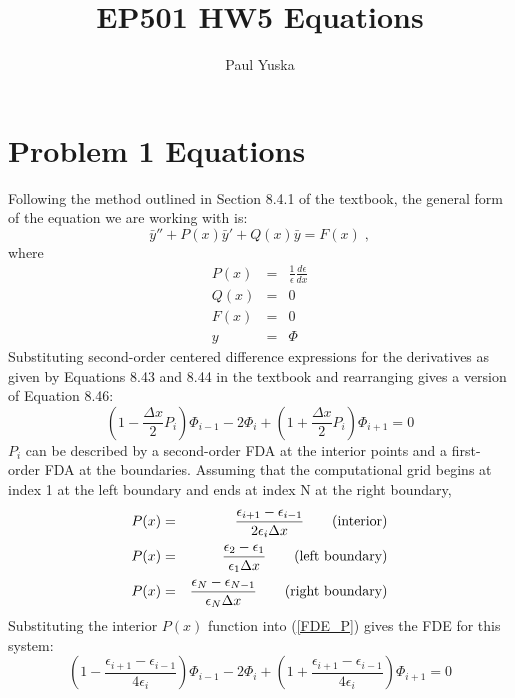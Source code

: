 \documentclass[12pt,letterpaper]{article}
\author{Paul Yuska}
\title{EP501 HW5 Equations}
\begin{document}
\maketitle

\section*{Problem 1 Equations}
Following the method outlined in Section 8.4.1 of the textbook, the general form of the equation we are working with is:
\begin{equation}
\bar{y}'' + P(x)\bar{y}' + Q(x)\bar{y} = F(x)\;,
\end{equation}
where
\begin{eqnarray*}
P(x) &=& \frac{1}{\epsilon}\frac{d\epsilon}{dx}\\
Q(x) &=& 0\\
F(x) &=& 0\\
y &=& \Phi
\end{eqnarray*}
Substituting second-order centered difference expressions for the derivatives as given by Equations 8.43 and 8.44 in the textbook and rearranging gives a version of Equation 8.46:
\begin{equation}
\label{FDE_P}
\left(1 - \frac{\Delta x}{2}P_i	\right)\Phi_{i-1} - 2\Phi_i + \left(1 + \frac{\Delta x}{2}P_i	\right)\Phi_{i+1} = 0
\end{equation}
$P_i$ can be described by a second-order FDA at the interior points and a first-order FDA at the boundaries. Assuming that the computational grid begins at index 1 at the left boundary and ends at index N at the right boundary,
\begin{eqnarray*}
P(x) &=& \frac{\epsilon_{i+1} - \epsilon_{i-1}}{2\epsilon_i \Delta x}\qquad \textnormal{(interior)}\\
P(x) &=& \frac{\epsilon_{2} - \epsilon_{1}}{\epsilon_1 \Delta x}\qquad \textnormal{(left boundary)}\\
P(x) &=& \frac{\epsilon_{N} - \epsilon_{N-1}}{\epsilon_N \Delta x}\qquad \textnormal{(right boundary)}
\end{eqnarray*}
Substituting the interior $P(x)$ function into (\ref{FDE_P}) gives the FDE for this system:
\begin{equation}
\left(1 - \frac{\epsilon_{i+1} - \epsilon_{i-1}}{4\epsilon_i}\right)\Phi_{i-1} - 2\Phi_i + \left(1 + \frac{\epsilon_{i+1} - \epsilon_{i-1}}{4\epsilon_i}	\right)\Phi_{i+1} = 0
\end{equation}
\end{document}
